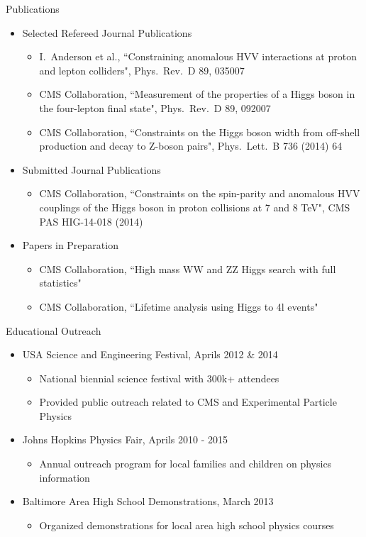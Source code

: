 \begin{small}
\begin{cvlist}{Publications}
\item
\begin{itemize}\itemsep=0.25em
	\item Selected Refereed Journal Publications
	\begin{itemize}
		\item I.\ Anderson et al., ``Constraining anomalous HVV interactions at proton and lepton colliders", Phys.\ Rev.\ D 89, 035007 
		\item CMS Collaboration, ``Measurement of the properties of a Higgs boson in the four-lepton final state", Phys.\ Rev.\ D 89, 092007
		\item CMS Collaboration, ``Constraints on the Higgs boson width from off-shell production and decay to Z-boson pairs", Phys.\ Lett.\ B 736 (2014) 64 
	\end{itemize}
	\item Submitted Journal Publications
	\begin{itemize}
		\item CMS Collaboration, ``Constraints on the spin-parity and anomalous HVV couplings of the Higgs boson in proton collisions at 7 and 8 TeV", CMS PAS HIG-14-018 (2014)
	\end{itemize}
	\item Papers in Preparation
	\begin{itemize}
		\item CMS Collaboration, ``High mass WW and ZZ Higgs search with full statistics"
		\item	CMS Collaboration, ``Lifetime analysis using Higgs to 4l events"   
	\end{itemize}
\end{itemize}
\end{cvlist}

\begin{cvlist}{Educational Outreach}
\item
\begin{itemize}\itemsep=0.25em
	\item USA Science and Engineering Festival, Aprils 2012 \& 2014
	\begin{itemize}
		\item National biennial science festival with 300k+ attendees
		\item Provided public outreach related to CMS and Experimental Particle Physics
	\end{itemize}
	\item Johns Hopkins Physics Fair, Aprils 2010 - 2015
	\begin{itemize}
    		\item Annual outreach program for local families and children on physics information
	\end{itemize}
	\item Baltimore Area High School Demonstrations, March 2013
	\begin{itemize}
		\item Organized demonstrations for local area high school physics courses
	\end{itemize}
\end{itemize}
\end{cvlist}

\setlength{\cvlabelwidth}{\oldcvlabelwidth}
\setlength{\cvlabelsep}{\oldcvlabelsep}
\end{small}
